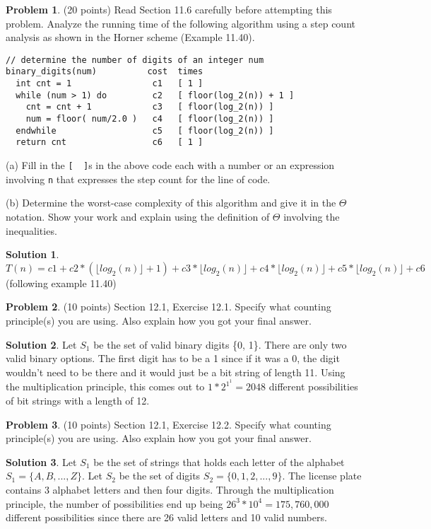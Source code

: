 \documentclass{article}
\theoremstyle{definition}
\newtheorem{problem}{Problem}
\newtheorem*{solution}{Solution}
\begin{document}
\begin{problem} (20 points) Read Section 11.6 carefully before attempting this problem.
Analyze the running time of the following algorithm using a step count analysis 
as shown in the Horner scheme (Example 11.40).
\begin{verbatim}
// determine the number of digits of an integer num
binary_digits(num)          cost  times
  int cnt = 1                c1   [ 1 ]
  while (num > 1) do         c2   [ floor(log_2(n)) + 1 ]
    cnt = cnt + 1            c3   [ floor(log_2(n)) ]
    num = floor( num/2.0 )   c4   [ floor(log_2(n)) ]
  endwhile                   c5   [ floor(log_2(n)) ]
  return cnt                 c6   [ 1 ]
\end{verbatim}
\noindent
(a) Fill in the \verb|[  ]|s in the above code each with a number or an expression involving
\verb|n| that expresses the step count for the line of code.

\medskip
\noindent
(b) Determine the worst-case complexity of this algorithm and give it in the $\Theta$ notation.
Show your work and explain using the definition of $\Theta$ involving the inequalities. 
\end{problem}
\begin{solution}
$T(n) = c1 + c2 * (\lfloor log_2(n) \rfloor + 1) + c3 * \lfloor log_2(n) \rfloor + c4 * \lfloor log_2(n) \rfloor + c5 * \lfloor log_2(n) \rfloor + c6$ (following example 11.40)
\end{solution}

\begin{problem} (10 points) Section 12.1, Exercise 12.1.  Specify what counting principle(s)
you are using.  Also explain how you got your final answer.
\end{problem}
\begin{solution} 
Let $S_1$ be the set of valid binary digits \{0, 1\}. There are only two valid binary options. The first digit has to be a 1 since if it was a 0, the digit wouldn't need to be there and it would just be a bit string of length 11. Using the multiplication principle, this comes out to $1 * 2^1^1 = 2048$ different possibilities of bit strings with a length of 12. 
\end{solution}

\begin{problem} (10 points) Section 12.1, Exercise 12.2.  Specify what counting principle(s)
you are using.  Also explain how you got your final answer.
\end{problem}
\begin{solution} 
Let $S_1$ be the set of strings that holds each letter of the alphabet $S_1 = \{A, B, ..., Z\}$. Let $S_2$ be the set of digits $S_2 = \{0, 1, 2, ..., 9\}$. The license plate contains 3 alphabet letters and then four digits. Through the multiplication principle, the number of possibilities end up being $26^3 * 10^4 = 175,760,000$ different possibilities since there are 26 valid letters and 10 valid numbers.
\end{solution}
\end{document}
